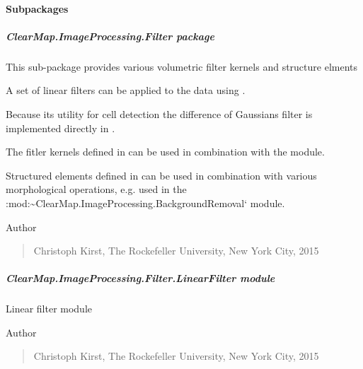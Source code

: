 \documentclass[letterpaper,10pt,english]{sphinxmanual}
\begin{document}
\paragraph{Subpackages}
\label{api/ClearMap.ImageProcessing:subpackages}

\subparagraph{ClearMap.ImageProcessing.Filter package}
\label{api/ClearMap.ImageProcessing.Filter:module-ClearMap.ImageProcessing.Filter}\label{api/ClearMap.ImageProcessing.Filter::doc}\label{api/ClearMap.ImageProcessing.Filter:clearmap-imageprocessing-filter-package}
This sub-package provides various volumetric filter kernels and structure elments

A set of linear filters can be applied to the data using
{\hyperref[api/ClearMap.ImageProcessing.Filter:module-ClearMap.ImageProcessing.Filter.LinearFilter]{\emph{}}}.

Because its utility for cell detection the difference of Gaussians filter
is implemented directly in {\hyperref[api/ClearMap.ImageProcessing.Filter:module-ClearMap.ImageProcessing.Filter.DoGFilter]{\emph{}}}.

The fitler kernels defined in {\hyperref[api/ClearMap.ImageProcessing.Filter:module-ClearMap.ImageProcessing.Filter.FilterKernel]{\emph{}}}
can be used in combination with the 
module.

Structured elements defined in
 can be used in
combination with various morphological operations, e.g. used in the
:mod:\textasciitilde{}ClearMap.ImageProcessing.BackgroundRemoval{}` module.

Author
\begin{quote}

Christoph Kirst, The Rockefeller University, New York City, 2015
\end{quote}


\subparagraph{ClearMap.ImageProcessing.Filter.LinearFilter module}
\label{api/ClearMap.ImageProcessing.Filter:module-ClearMap.ImageProcessing.Filter.LinearFilter}\label{api/ClearMap.ImageProcessing.Filter:clearmap-imageprocessing-filter-linearfilter-module}
Linear filter module

Author
\begin{quote}

Christoph Kirst, The Rockefeller University, New York City, 2015
\end{quote}
\end{document}
